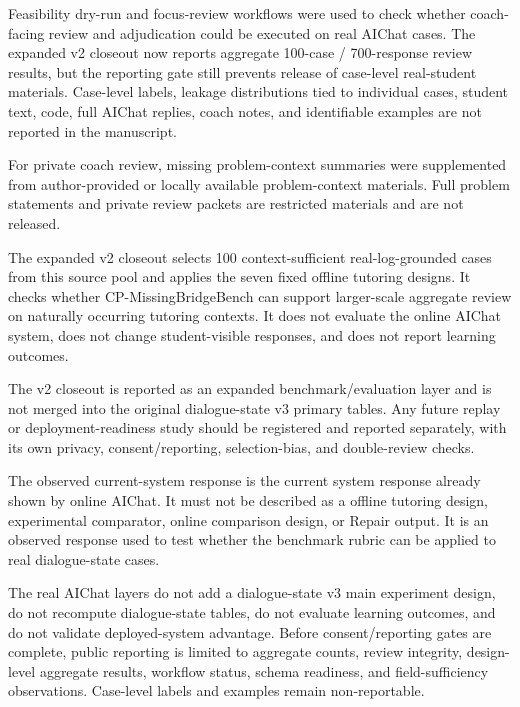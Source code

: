 \documentclass[11pt]{article}
\begin{document}
Feasibility dry-run and focus-review workflows were used to check whether coach-facing review and adjudication could be executed on real AIChat cases. The expanded v2 closeout now reports aggregate 100-case / 700-response review results, but the reporting gate still prevents release of case-level real-student materials. Case-level labels, leakage distributions tied to individual cases, student text, code, full AIChat replies, coach notes, and identifiable examples are not reported in the manuscript.

For private coach review, missing problem-context summaries were supplemented from author-provided or locally available problem-context materials. Full problem statements and private review packets are restricted materials and are not released.

The expanded v2 closeout selects 100 context-sufficient real-log-grounded cases from this source pool and applies the seven fixed offline tutoring designs. It checks whether CP-MissingBridgeBench can support larger-scale aggregate review on naturally occurring tutoring contexts. It does not evaluate the online AIChat system, does not change student-visible responses, and does not report learning outcomes.

The v2 closeout is reported as an expanded benchmark/evaluation layer and is not merged into the original dialogue-state v3 primary tables. Any future replay or deployment-readiness study should be registered and reported separately, with its own privacy, consent/reporting, selection-bias, and double-review checks.

The observed current-system response is the current system response already shown by online AIChat. It must not be described as a offline tutoring design, experimental comparator, online comparison design, or Repair output. It is an observed response used to test whether the benchmark rubric can be applied to real dialogue-state cases.

The real AIChat layers do not add a dialogue-state v3 main experiment design, do not recompute dialogue-state tables, do not evaluate learning outcomes, and do not validate deployed-system advantage. Before consent/reporting gates are complete, public reporting is limited to aggregate counts, review integrity, design-level aggregate results, workflow status, schema readiness, and field-sufficiency observations. Case-level labels and examples remain non-reportable.



\end{document}
